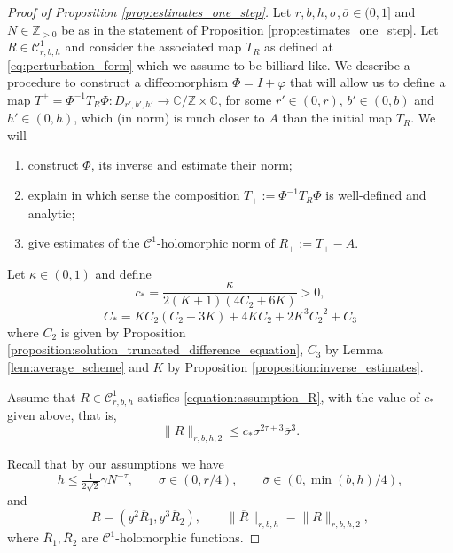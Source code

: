\documentclass[10pt]{article}
\newcommand{\Z}{\mathbb{Z}}
\newcommand{\C}{\mathbb{C}}
\newcommand{\Domain}[3]{D_{#1, #2, #3}}
\begin{document}
\begin{proof}[Proof of Proposition \ref{prop:estimates_one_step}]
Let $r,b,h,\sigma,\overline\sigma\in(0,1]$ and $N\in\Z_{>0}$ be as in the statement of Proposition \ref{prop:estimates_one_step}. Let $R\in\mathscr C^1_{r,b,h}$ and consider the associated map $T_R$ as defined at \eqref{eq:perturbation_form} which we assume to be billiard-like. We describe a procedure to construct a diffeomorphism $\Phi=I+\varphi$ that will allow us to define a map $T^+ = \Phi^{-1}T_R\Phi:\Domain{r'}{b'}{h'}\to \C/\Z \times \C$, for some $r'\in(0,r)$, $b'\in(0,b)$ and $h'\in(0,h)$, which (in norm) is much closer to $A$ than the initial map $T_R$. We will 
\begin{enumerate}
    \item construct $\Phi$, its inverse and estimate their norm;
    \item explain in which sense the composition $T_+:=\Phi^{-1}T_R\Phi$ is well-defined and analytic;
    \item give estimates of the $\mathscr C^1$-holomorphic norm of $R_+:=T_+-A$.
\end{enumerate}
\vspace{0.2cm}

 Let $\kappa \in (0, 1)$ and  define
\[
c_\ast = \frac{\kappa}{2(K+1)(4C_2+6K)}>0,
\]
\[
C_{\ast} = KC_2(C_2+3K)+4KC_2+2K^3{C_2}^2+ C_3
\]
where $C_2$ is given by Proposition \ref{proposition:solution_truncated_difference_equation}, $C_3$ by Lemma \ref{lem:average_scheme} and $K$ by Proposition \ref{proposition:inverse_estimates}. 

Assume that  $R\in\mathscr C^1_{r,b,h}$ satisfies \eqref{equation:assumption_R}, with the value of $c_*$ given above, that is, $$\|R \|_{r, b, h, 2} \leq c_\ast \sigma^{2\tau+3}\overline\sigma^3.$$

Recall that by our assumptions we have
\[ h \leq \tfrac{1}{2\sqrt 2}\gamma N^{-\tau}, \qquad \sigma\in(0,r/4), \qquad \overline\sigma\in(0,\min(b,h)/4),\]
and
\[ R = (y^2 \overline R_1, y^3 \overline R_2), \qquad \| \overline R\|_{r, b, h} = \|R \|_{r, b, h, 2},\]
where $\overline R_1, \overline R_2$ are $\mathscr C^1$-holomorphic functions.


\end{proof}
\end{document}
